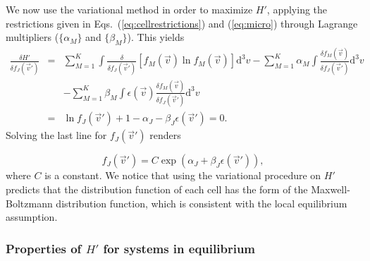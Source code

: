 We now use the variational method in order to maximize $H'$, applying the restrictions
given in Eqs.~(\ref{eq:cellrestrictions}) and (\ref{eq:micro}) through Lagrange
multipliers ($\{\alpha_M\}$ and $\{\beta_M\}$). This yields
%
\begin{eqnarray}
    \frac{\delta H'}{\delta f_J(\vec{v}')} & = & \sum_{M=1}^{K}\int
      \frac{\delta}{\delta f_J(\vec{v}')}\left[
        f_M(\vec{v})\ln f_M(\vec{v})
        \right]
       \mathrm{d}^3v -\sum_{M=1}^{K}\alpha_M\int
       	\frac{\delta f_M(\vec{v})}{\delta f_J(\vec{v}')}
      \mathrm{d}^3v\nonumber\\
    & & -\sum_{M=1}^{K}\beta_M\int\epsilon(\vec{v})
    	\frac{\delta f_M(\vec{v})}{\delta f_J(\vec{v}')}
      \mathrm{d}^3v \nonumber\\
    & = & \ln f_J(\vec{v}')+1-\alpha_J-\beta_J \epsilon(\vec{v}')=0.
\end{eqnarray}
%
Solving the last line for $f_J(\vec{v}')$ renders
%
\begin{comment}
\begin{eqnarray}
    \ln f_J(\vec{v}') & = & \alpha_J+\beta_J \epsilon(\vec{v}')
       -1\quad\Rightarrow\quad f_J(\vec{v}')\\
    & = & e^{\alpha_J +\beta_J \epsilon(\vec{v}')-1}\nonumber\\
    & = & Ce^{\alpha_J+\beta_J \epsilon(\vec{v}') } \label{eq:relacion1},
\end{eqnarray}
\end{comment}
\begin{equation}\label{eq:relacion1}
	f_J(\vec{v}') = C\exp\left({\alpha_J+\beta_J \epsilon(\vec{v}') }\right),
\end{equation}
%
where $C$ is a constant. We notice that using the variational procedure on
$H'$ predicts that the
distribution function of each cell has the form of the Maxwell-Boltzmann
distribution function, which is consistent with the local equilibrium assumption.

\subsubsection{Properties of $H'$ for systems in equilibrium}

